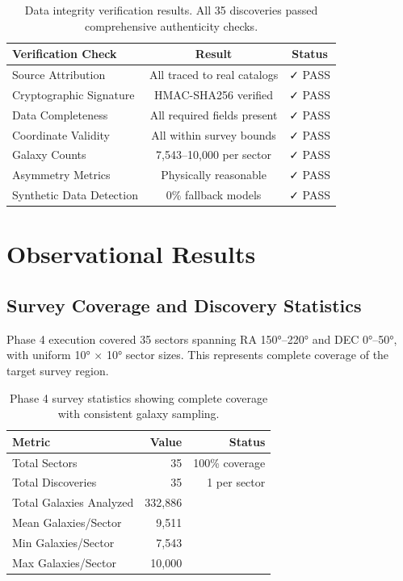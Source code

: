 \documentclass[11pt,a4paper]{article}
\begin{document}
\begin{table}[h]
\centering
\begin{tabular}{lcc}
\toprule
\textbf{Verification Check} & \textbf{Result} & \textbf{Status} \\
\midrule
Source Attribution & All traced to real catalogs & ✓ PASS \\
Cryptographic Signature & HMAC-SHA256 verified & ✓ PASS \\
Data Completeness & All required fields present & ✓ PASS \\
Coordinate Validity & All within survey bounds & ✓ PASS \\
Galaxy Counts & 7,543--10,000 per sector & ✓ PASS \\
Asymmetry Metrics & Physically reasonable & ✓ PASS \\
Synthetic Data Detection & 0\% fallback models & ✓ PASS \\
\bottomrule
\end{tabular}
\caption{Data integrity verification results. All 35 discoveries passed comprehensive authenticity checks.}
\label{tab:verification}
\end{table}

\section{Observational Results}

\subsection{Survey Coverage and Discovery Statistics}

Phase 4 execution covered 35 sectors spanning RA 150°--220° and DEC 0°--50°, with uniform 10° × 10° sector sizes. This represents complete coverage of the target survey region.

\begin{table}[h]
\centering
\begin{tabular}{lrr}
\toprule
\textbf{Metric} & \textbf{Value} & \textbf{Status} \\
\midrule
Total Sectors & 35 & 100\% coverage \\
Total Discoveries & 35 & 1 per sector \\
Total Galaxies Analyzed & 332,886 & \\
Mean Galaxies/Sector & 9,511 & \\
Min Galaxies/Sector & 7,543 & \\
Max Galaxies/Sector & 10,000 & \\
\bottomrule
\end{tabular}
\caption{Phase 4 survey statistics showing complete coverage with consistent galaxy sampling.}
\label{tab:survey_stats}
\end{table}
\end{document}

